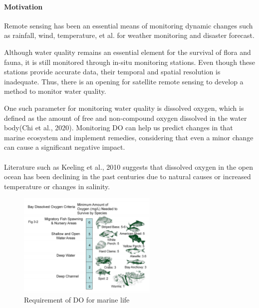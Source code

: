 \paragraph{Motivation}
Remote sensing has been an essential means of monitoring dynamic changes such as rainfall, wind, temperature, et al. for weather monitoring and disaster forecast.

Although water quality remains an essential element for the survival of flora and fauna, it is still monitored through in-situ monitoring stations. Even though these stations provide accurate data, their temporal and spatial resolution is inadequate. Thus, there is an opening
for satellite remote sensing to develop a method to monitor water quality.

\begin{minipage}{0.5\textwidth}
    One such parameter for monitoring water quality is dissolved oxygen, which is defined as the amount of free and non-compound oxygen dissolved in the water body(Chi et al., 2020). Monitoring DO can help us predict changes in that marine ecosystem and implement remedies, considering that even a minor change can cause a significant negative impact.
    
    \paragraph*{}
    Literature such as Keeling et al., 2010\cite{keeling_2010} suggests that dissolved oxygen in the open ocean has been declining in the past centuries due to natural causes or increased temperature or changes in salinity.
\end{minipage}
\begin{minipage}{0.5\textwidth}
    \begin{figure}[H]
        \includegraphics[height=5cm]{figs/fish_requirements.jpg}
        \caption{Requirement of DO for marine life}
    \end{figure}
\end{minipage}



